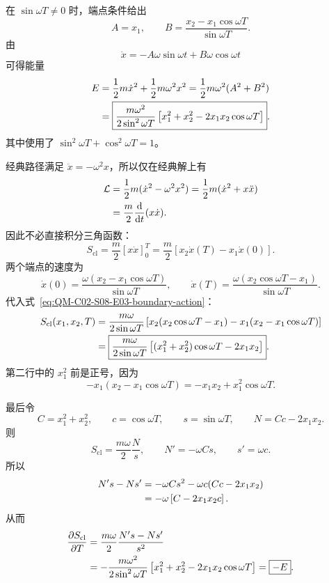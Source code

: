 \begin{checkedsolution}
在 $\sin\omega T\neq0$ 时，端点条件给出
\begin{equation}
  A=x_1,
  \qquad
  B=\frac{x_2-x_1\cos\omega T}{\sin\omega T}.
  \label{eq:QM-C02-S08-E03-ab}
\end{equation}
由
\[
  \dot x=-A\omega\sin\omega t+B\omega\cos\omega t
\]
可得能量
\begin{align}
  E
  &=\frac12m\dot x^2+\frac12m\omega^2x^2
  =\frac12m\omega^2(A^2+B^2) \notag\\
  &=\boxed{
  \frac{m\omega^2}{2\sin^2\omega T}
  \left[
    x_1^2+x_2^2-2x_1x_2\cos\omega T
  \right]}.
  \label{eq:QM-C02-S08-E03-energy}
\end{align}
其中使用了 $\sin^2\omega T+\cos^2\omega T=1$。

经典路径满足 $\ddot x=-\omega^2x$，所以仅在经典解上有
\begin{align}
  \mathcal L
  &=\frac12m(\dot x^2-\omega^2x^2)
  =\frac12m(\dot x^2+x\ddot x) \notag\\
  &=\frac m2\frac{\mathop{}\!\mathrm{d}}{\mathop{}\!\mathrm{d} t}(x\dot x).
  \label{eq:QM-C02-S08-E03-on-shell-lagrangian}
\end{align}
因此不必直接积分三角函数：
\begin{equation}
  S_{\mathrm{cl}}
  =\frac m2[x\dot x]_0^T
  =\frac m2\left[x_2\dot x(T)-x_1\dot x(0)\right].
  \label{eq:QM-C02-S08-E03-boundary-action}
\end{equation}
两个端点的速度为
\begin{equation}
  \dot x(0)
  =\frac{\omega(x_2-x_1\cos\omega T)}{\sin\omega T},
  \qquad
  \dot x(T)
  =\frac{\omega(x_2\cos\omega T-x_1)}{\sin\omega T}.
  \label{eq:QM-C02-S08-E03-endpoint-velocities}
\end{equation}
代入式~\eqref{eq:QM-C02-S08-E03-boundary-action}：
\begin{align}
  S_{\mathrm{cl}}(x_1,x_2,T)
  &=\frac{m\omega}{2\sin\omega T}
  \left[
    x_2(x_2\cos\omega T-x_1)
    -x_1(x_2-x_1\cos\omega T)
  \right] \notag\\
  &=\boxed{
  \frac{m\omega}{2\sin\omega T}
  \left[
    (x_1^2+x_2^2)\cos\omega T-2x_1x_2
  \right]}.
  \label{eq:QM-C02-S08-E03-action}
\end{align}
第二行中的 $x_1^2$ 前是正号，因为
\[
  -x_1(x_2-x_1\cos\omega T)
  =-x_1x_2+x_1^2\cos\omega T.
\]

最后令
\[
  C=x_1^2+x_2^2,
  \qquad
  c=\cos\omega T,
  \qquad
  s=\sin\omega T,
  \qquad
  N=Cc-2x_1x_2.
\]
则
\[
  S_{\mathrm{cl}}=\frac{m\omega}{2}\frac Ns,
  \qquad
  N'=-\omega Cs,
  \qquad
  s'=\omega c.
\]
所以
\begin{align}
  N's-Ns'
  &=-\omega Cs^2-\omega c(Cc-2x_1x_2) \notag\\
  &=-\omega\left[C-2x_1x_2c\right].
  \label{eq:QM-C02-S08-E03-quotient-numerator}
\end{align}
从而
\begin{align}
  \frac{\partial S_{\mathrm{cl}}}{\partial T}
  &=\frac{m\omega}{2}\frac{N's-Ns'}{s^2} \notag\\
  &=-\frac{m\omega^2}{2\sin^2\omega T}
  \left[
    x_1^2+x_2^2-2x_1x_2\cos\omega T
  \right]
  =\boxed{-E}.
  \label{eq:QM-C02-S08-E03-action-derivative}
\end{align}


\end{checkedsolution}
